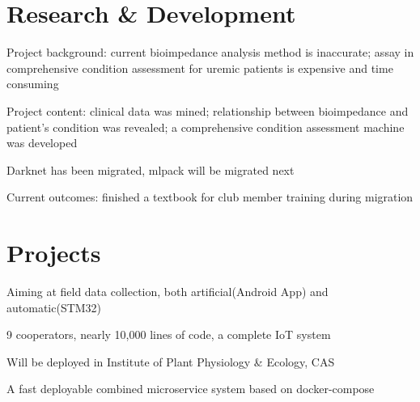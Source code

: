 \documentclass[]{deedy-resume-openfont}
\begin{document}
\hfill
\begin{minipage}[t]{0.73\textwidth} 


\section{Research \& Development}
\descript{}
\vspace{\topsep}
\begin{tightemize}
\item Project background: current bioimpedance analysis method is inaccurate; assay in comprehensive condition assessment for uremic patients is expensive and time consuming
\item Project content: clinical data was mined; relationship between bioimpedance and patient's condition was revealed; a comprehensive condition assessment machine was developed
\end{tightemize}
\sectionsep

\descript{}
\begin{tightemize}
    \item Darknet has been migrated, mlpack will be migrated next
    \item Current outcomes: finished a textbook for club member training during migration
\end{tightemize}
\sectionsep

\section{Projects}
    \begin{tightemize}
        \item Aiming at field data collection, both artificial(Android App) and automatic(STM32)
        \item 9 cooperators, nearly 10,000 lines of code, a complete IoT system
		\item Will be deployed in Institute of Plant Physiology \& Ecology, CAS
		\item A fast deployable combined microservice system based on docker-compose
	\end{tightemize}
	\sectionsep


\end{minipage}
\end{document}
